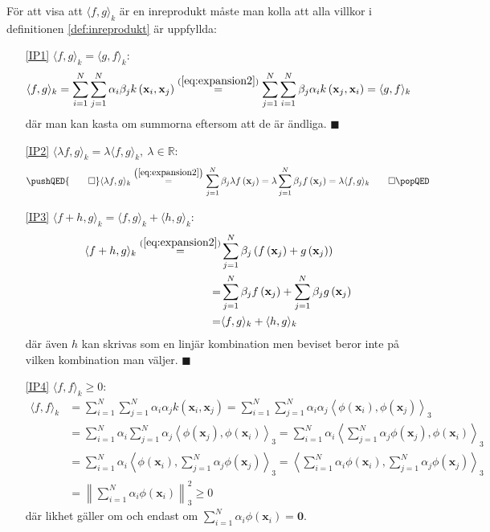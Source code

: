 \documentclass[a4paper, 12pt]{report}
\theoremstyle{definition}
\theoremstyle{remark}
\renewcommand\qedsymbol{$\blacksquare$}
\newcommand{\bfx}{\mathbf{x}}
\begin{document}
För att visa att $\langle f, g \rangle_k$ är en inreprodukt måste man kolla att alla villkor i definitionen \ref{def:inreprodukt} är uppfyllda:
\begin{enumerate}
	\item[\ref{IP1}] $\langle f, g \rangle_k=\langle g, f \rangle_k$:
	\begin{align*}
		\langle f, g \rangle_k = \sum_{i=1}^{N} \sum_{j=1}^{N} \alpha_i \beta_j k\left(\bfx_i, \bfx_j\right) \overset{(\ref{eq:expansion2})}{=} \sum_{j=1}^{N} \sum_{i=1}^{N}  \beta_j \alpha_i k\left(\bfx_j, \bfx_i\right) = \langle g, f \rangle_k
	\end{align*}
	där man kan kasta om summorna eftersom att de är ändliga. \hfill \qedsymbol
	\item[\ref{IP2}] $\langle \lambda f, g \rangle_k=\lambda\langle f, g \rangle_k,~\lambda\in\mathbb{R}$:
	\begin{equation*}
	\pushQED{\qed}
		\langle \lambda f, g \rangle_k	\overset{\left(\ref{eq:expansion2}\right)}{=} \sum_{j=1}^{N} \beta_j \lambda f\left(\bfx_j\right) = \lambda \sum_{j=1}^{N} \beta_j f\left(\bfx_j\right) = \lambda\langle f, g \rangle_k \qedhere
		\popQED
	\end{equation*}
	\item[\ref{IP3}] $\langle f+h, g\rangle_k = \langle f, g\rangle_k + \langle h, g\rangle_k$:
	\begin{align*}
		\langle f+h, g \rangle_k \overset{(\ref{eq:expansion2})}{=} &\sum_{j=1}^{N} \beta_j \left(f\left(\bfx_j\right) + g\left(\bfx_j\right)\right)\\
		= &\sum_{j=1}^{N} \beta_j f\left(\bfx_j\right) + \sum_{j=1}^{N} \beta_j g\left(\bfx_j\right)\\
		= &\langle f, g\rangle_k + \langle h, g\rangle_k
	\end{align*}
	där även $h$ kan skrivas som en linjär kombination men beviset beror inte på vilken kombination man väljer. \hfill \qedsymbol
	\item[\ref{IP4}] $\langle f, f \rangle_k\geq0$:
	\begin{align*}
	\langle f, f \rangle_k &= \sum_{i=1}^{N}\sum_{j=1}^{N}\alpha_i\alpha_jk\left(\bfx_i,\bfx_j\right)
	= \sum_{i=1}^{N}\sum_{j=1}^{N}\alpha_i\alpha_j\left\langle\phi\left(\bfx_i\right),\phi\left(\bfx_j\right)\right\rangle_3\\
	&= \sum_{i=1}^{N}\alpha_i\sum_{j=1}^{N}\alpha_j\left\langle\phi\left(\bfx_j\right),\phi\left(\bfx_i\right)\right\rangle_3
	= \sum_{i=1}^{N}\alpha_i\left\langle\sum_{j=1}^{N}\alpha_j\phi\left(\bfx_j\right),\phi\left(\bfx_i\right)\right\rangle_3\\
	&= \sum_{i=1}^{N}\alpha_i\left\langle\phi\left(\bfx_i\right),\sum_{j=1}^{N}\alpha_j\phi\left(\bfx_j\right)\right\rangle_3
	= \left\langle\sum_{i=1}^{N}\alpha_i\phi\left(\bfx_i\right),\sum_{j=1}^{N}\alpha_j\phi\left(\bfx_j\right)\right\rangle_3\\
	&= \left\|\sum_{i=1}^{N}\alpha_i\phi\left(\bfx_i\right)\right\|_3^2\geq 0
	\end{align*}
	där likhet gäller om och endast om $\sum_{i=1}^{N}\alpha_i\phi\left(\bfx_i\right)=\mathbf{0}$.
	

\end{enumerate}
\end{document}
